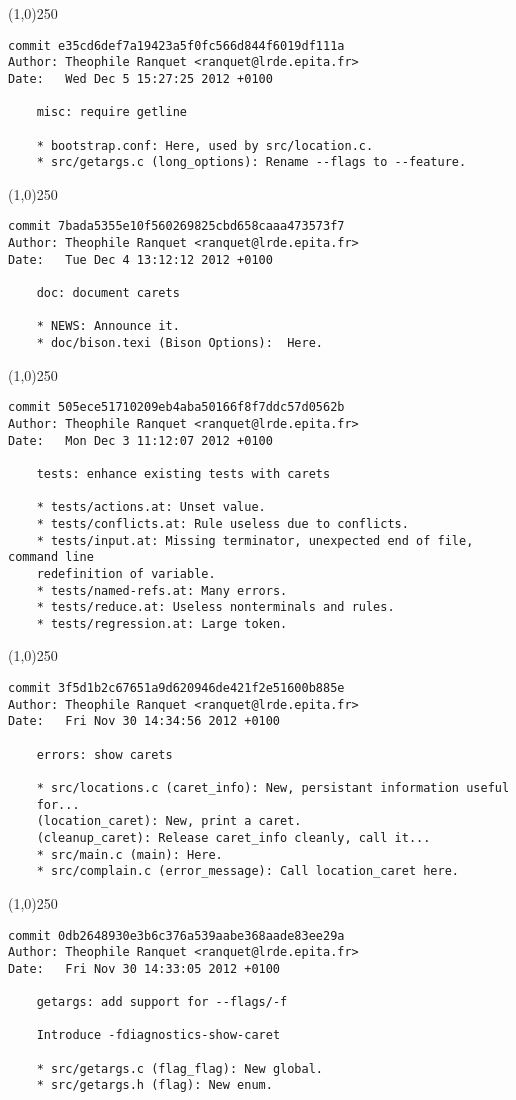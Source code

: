 \line(1,0){250}
\begin{verbatim}
commit e35cd6def7a19423a5f0fc566d844f6019df111a
Author: Theophile Ranquet <ranquet@lrde.epita.fr>
Date:   Wed Dec 5 15:27:25 2012 +0100

    misc: require getline
    
    * bootstrap.conf: Here, used by src/location.c.
    * src/getargs.c (long_options): Rename --flags to --feature.

\end{verbatim}
\line(1,0){250}
\begin{verbatim}
commit 7bada5355e10f560269825cbd658caaa473573f7
Author: Theophile Ranquet <ranquet@lrde.epita.fr>
Date:   Tue Dec 4 13:12:12 2012 +0100

    doc: document carets
    
    * NEWS: Announce it.
    * doc/bison.texi (Bison Options):  Here.

\end{verbatim}
\line(1,0){250}
\begin{verbatim}
commit 505ece51710209eb4aba50166f8f7ddc57d0562b
Author: Theophile Ranquet <ranquet@lrde.epita.fr>
Date:   Mon Dec 3 11:12:07 2012 +0100

    tests: enhance existing tests with carets
    
    * tests/actions.at: Unset value.
    * tests/conflicts.at: Rule useless due to conflicts.
    * tests/input.at: Missing terminator, unexpected end of file, command line
    redefinition of variable.
    * tests/named-refs.at: Many errors.
    * tests/reduce.at: Useless nonterminals and rules.
    * tests/regression.at: Large token.

\end{verbatim}
\line(1,0){250}
\begin{verbatim}
commit 3f5d1b2c67651a9d620946de421f2e51600b885e
Author: Theophile Ranquet <ranquet@lrde.epita.fr>
Date:   Fri Nov 30 14:34:56 2012 +0100

    errors: show carets
    
    * src/locations.c (caret_info): New, persistant information useful
    for...
    (location_caret): New, print a caret.
    (cleanup_caret): Release caret_info cleanly, call it...
    * src/main.c (main): Here.
    * src/complain.c (error_message): Call location_caret here.

\end{verbatim}
\line(1,0){250}
\begin{verbatim}
commit 0db2648930e3b6c376a539aabe368aade83ee29a
Author: Theophile Ranquet <ranquet@lrde.epita.fr>
Date:   Fri Nov 30 14:33:05 2012 +0100

    getargs: add support for --flags/-f
    
    Introduce -fdiagnostics-show-caret
    
    * src/getargs.c (flag_flag): New global.
    * src/getargs.h (flag): New enum.

\end{verbatim}
